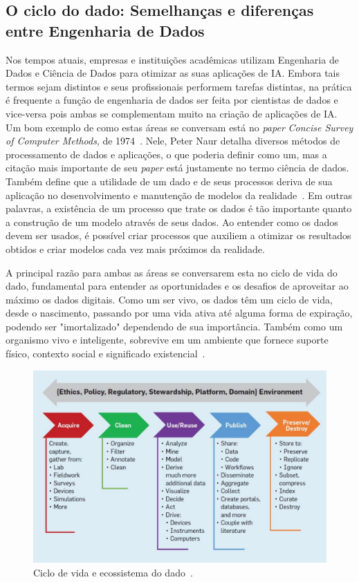 \documentclass[portugues]{ic-tese}
\begin{document}
\subsection{O ciclo do dado: Semelhanças e diferenças entre Engenharia de Dados}

Nos tempos atuais, empresas e instituições acadêmicas utilizam Engenharia de Dados e Ciência de Dados para otimizar as suas aplicações de IA. Embora tais termos sejam distintos e seus profissionais performem tarefas distintas, na prática é frequente a função de engenharia de dados ser feita por cientistas de dados e vice-versa pois ambas se complementam muito na criação de aplicações de IA. Um bom exemplo de como estas áreas se conversam está no \textit{paper} \textit{Concise Survey of Computer Methods}, de 1974~\citep{Panoply_2017}. Nele, Peter Naur detalha diversos métodos de processamento de dados e aplicações, o que poderia definir como um, mas a citação mais importante de seu \textit{paper} está justamente no termo ciência de dados. Também define que a utilidade de um dado e de seus processos deriva de sua aplicação no desenvolvimento e manutenção de modelos da realidade~\citep{Foote_2021}. Em outras palavras, a existência de um processo que trate os dados é tão importante quanto a construção de um modelo através de seus dados. Ao entender como os dados devem ser usados, é possível criar processos que auxiliem a otimizar os resultados obtidos e criar modelos cada vez mais próximos da realidade.

A principal razão para ambas as áreas se conversarem esta no ciclo de vida do dado, fundamental para entender as oportunidades e os desafios de aproveitar ao máximo os dados digitais. Como um ser vivo, os dados têm um ciclo de vida, desde o nascimento, passando por uma vida ativa até alguma forma de expiração, podendo ser "imortalizado" dependendo de sua importância. Também como um organismo vivo e inteligente, sobrevive em um ambiente que fornece suporte físico, contexto social e significado existencial~\citep{Berman_2018}.

\begin{figure}[h]
\centering
\includegraphics[scale=0.6]{images/data_life_cycle.jpg}
\caption {Ciclo de vida e ecossistema do dado~\citep{Berman_2018}.}
\label{fig:cicloDado}
\end{figure}
\end{document}
